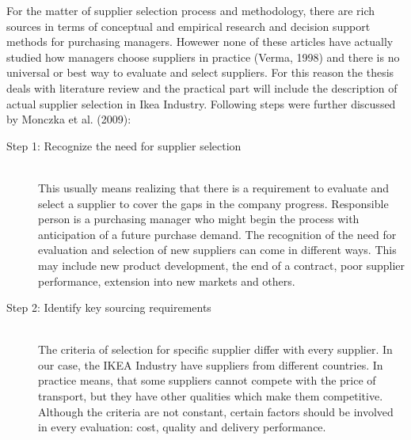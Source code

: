 \documentclass[oneside,12pt]{article}%
\begin{document}
For the matter of supplier selection process and methodology, there are rich sources in terms of conceptual and empirical research and decision support methods for purchasing managers. Howewer none of these articles have actually studied how managers choose suppliers in practice (Verma, 1998) and there is no universal or best way to evaluate and select suppliers. For this reason the thesis deals with literature review and the practical part will include the description of actual supplier selection in Ikea Industry. Following steps were further discussed by Monczka et al. (2009):


\begin{description}
  \item[Step 1: Recognize the need for supplier selection] \hfill \\
  This usually means realizing that there is a requirement to evaluate and select a supplier to cover the gaps in the company progress. Responsible person is a purchasing manager who might begin the process with anticipation of a future purchase demand. The recognition of the need for evaluation and selection of new suppliers can come in different ways. This may include new product development, the end of a contract, poor supplier performance, extension into new markets and others.

  \item[Step 2: Identify key sourcing requirements] \hfill \\
  The criteria of selection for specific supplier differ with every supplier. In our case, the IKEA Industry have suppliers from different countries. In practice means, that some suppliers cannot compete with the price of transport, but they have other qualities which make them competitive. Although the criteria are not constant, certain factors should be involved in every evaluation: cost, quality and delivery performance.


\end{description}
\end{document}
